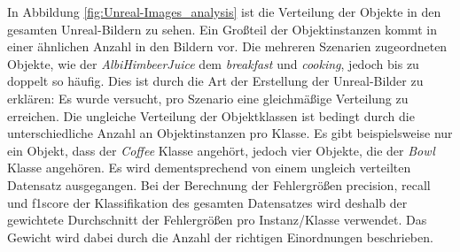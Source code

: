 In Abbildung \ref{fig:Unreal-Images_analysis} ist die Verteilung der Objekte in den gesamten Unreal-Bildern zu sehen. Ein Großteil der Objektinstanzen kommt in einer ähnlichen Anzahl in den Bildern vor. Die mehreren Szenarien zugeordneten Objekte, wie der \textit{AlbiHimbeerJuice} dem \textit{breakfast} und \textit{cooking}, jedoch bis zu doppelt so häufig. Dies ist durch die Art der Erstellung der Unreal-Bilder zu erklären: Es wurde versucht, pro Szenario eine gleichmäßige Verteilung zu erreichen. \newline
Die ungleiche Verteilung der Objektklassen ist bedingt durch die unterschiedliche Anzahl an Objektinstanzen pro Klasse. Es gibt beispielsweise nur ein Objekt, dass der \textit{Coffee} Klasse angehört, jedoch vier Objekte, die der \textit{Bowl} Klasse angehören. \newline
Es wird dementsprechend von einem ungleich verteilten Datensatz ausgegangen. Bei der Berechnung der Fehlergrößen \gls{precision}, \gls{recall} und \gls{f1score} der Klassifikation des gesamten Datensatzes wird deshalb der gewichtete Durchschnitt der Fehlergrößen pro Instanz/Klasse verwendet. Das Gewicht wird dabei durch die Anzahl der richtigen Einordnungen beschrieben. \par

